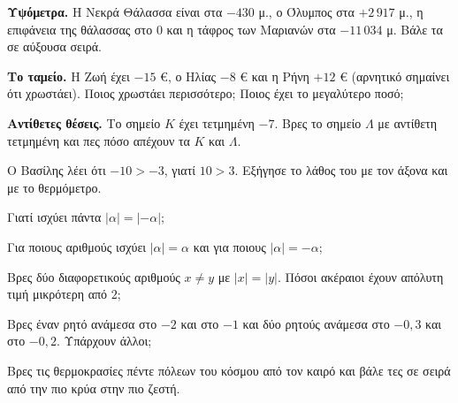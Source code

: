 \ex \textbf{Υψόμετρα.} Η Νεκρά Θάλασσα είναι στα $-430$ μ., ο Όλυμπος στα $+2\,917$ μ., η επιφάνεια της θάλασσας στο $0$ και η τάφρος των Μαριανών στα $-11\,034$ μ. Βάλε τα σε αύξουσα σειρά.

\ex \textbf{Το ταμείο.} Η Ζωή έχει $-15$ €, ο Ηλίας $-8$ € και η Ρήνη $+12$ € (αρνητικό σημαίνει ότι χρωστάει). Ποιος χρωστάει περισσότερο; Ποιος έχει το μεγαλύτερο ποσό;

\ex \textbf{Αντίθετες θέσεις.} Το σημείο $K$ έχει τετμημένη $-7$. Βρες το σημείο $\Lambda$ με αντίθετη τετμημένη και πες πόσο απέχουν τα $K$ και $\Lambda$.


\ex Ο Βασίλης λέει ότι $-10>-3$, γιατί $10>3$. Εξήγησε το λάθος του με τον άξονα και με το θερμόμετρο.

\ex Γιατί ισχύει πάντα $|\alpha|=|-\alpha|$;

\ex Για ποιους αριθμούς ισχύει $|\alpha|=\alpha$ και για ποιους $|\alpha|=-\alpha$;

\ex Βρες δύο διαφορετικούς αριθμούς $x\neq y$ με $|x|=|y|$. Πόσοι ακέραιοι έχουν απόλυτη τιμή μικρότερη από $2$;

\ex Βρες έναν ρητό ανάμεσα στο $-2$ και στο $-1$ και δύο ρητούς ανάμεσα στο $-0{,}3$ και στο $-0{,}2$. Υπάρχουν άλλοι;


\ex Βρες τις θερμοκρασίες πέντε πόλεων του κόσμου από τον καιρό και βάλε τες σε σειρά από την πιο κρύα στην πιο ζεστή.
